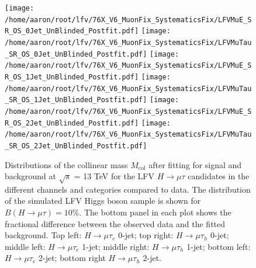 \documentclass[oneside, letterpaper, oldfontcommands]{memoir}
\begin{document}
\begin{figure}[hbtp]\centering
 \texttt{[image: /home/aaron/root/lfv/76X\_V6\_MuonFix\_SystematicsFix/LFVMuE\_SR\_OS\_0Jet\_UnBlinded\_Postfit.pdf]}
 \texttt{[image: /home/aaron/root/lfv/76X\_V6\_MuonFix\_SystematicsFix/LFVMuTau\_SR\_OS\_0Jet\_UnBlinded\_Postfit.pdf]}
 \texttt{[image: /home/aaron/root/lfv/76X\_V6\_MuonFix\_SystematicsFix/LFVMuE\_SR\_OS\_1Jet\_UnBlinded\_Postfit.pdf]}
 \texttt{[image: /home/aaron/root/lfv/76X\_V6\_MuonFix\_SystematicsFix/LFVMuTau\_SR\_OS\_1Jet\_UnBlinded\_Postfit.pdf]}
 \texttt{[image: /home/aaron/root/lfv/76X\_V6\_MuonFix\_SystematicsFix/LFVMuE\_SR\_OS\_2Jet\_UnBlinded\_Postfit.pdf]}
 \texttt{[image: /home/aaron/root/lfv/76X\_V6\_MuonFix\_SystematicsFix/LFVMuTau\_SR\_OS\_2Jet\_UnBlinded\_Postfit.pdf]}
\caption{Distributions of the collinear mass $M_\text{col}$ after fitting for signal and background at $\sqrt{s}$ = 13 TeV for the LFV $H \rightarrow \mu \tau$ candidates in
the different
channels and categories compared to data.
The distribution of the simulated LFV Higgs boson sample is shown for $B(H \rightarrow \mu \tau )=10\%$.
The bottom panel in each plot shows the fractional difference between the observed data and the fitted background. Top left: $H \rightarrow \mu \tau_{e}$ 0-jet; top right: $H \rightarrow \mu \tau_{h}$ 0-jet;
middle left: $H \rightarrow \mu \tau_{e}$ 1-jet; middle right: $H \rightarrow \mu \tau_{h}$ 1-jet; bottom left: $H \rightarrow \mu \tau_{e}$ 2-jet;
bottom right $H \rightarrow \mu \tau_{h}$ 2-jet.}
 \label{fig:Mcol_SignalRegion13TeV}\end{figure}
 
\end{document}
